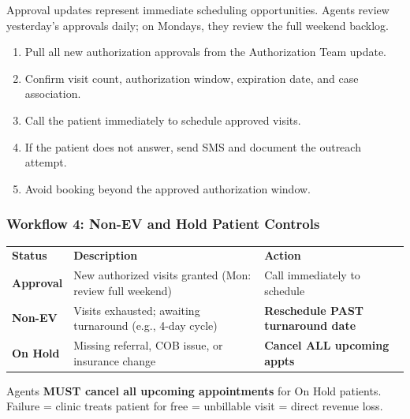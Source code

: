 \documentclass[11pt,a4paper]{article}
\begin{document}
Approval updates represent immediate scheduling opportunities. Agents review yesterday's approvals daily; on Mondays, they review the full weekend backlog.

\begin{tcolorbox}[successbox,title={Approval Scheduling SOP}]
\begin{enumerate}
  \item Pull all new authorization approvals from the Authorization Team update.
  \item Confirm visit count, authorization window, expiration date, and case association.
  \item Call the patient immediately to schedule approved visits.
  \item If the patient does not answer, send SMS and document the outreach attempt.
  \item Avoid booking beyond the approved authorization window.
\end{enumerate}
\end{tcolorbox}

\subsubsection{Workflow 4: Non-EV and Hold Patient Controls}

\begin{tcolorbox}[warnbox,title={Insurance Status Management Rules}]
\begin{tabularx}{\linewidth}{L{3.0cm} X L{3.2cm}}
  \color{white}\textbf{Status} & \color{white}\textbf{Description} & \color{white}\textbf{Action} \\
  \textbf{Approval}
    & New authorized visits granted (Mon: review full weekend)
    & Call immediately to schedule \\
  \textbf{Non-EV}
    & Visits exhausted; awaiting turnaround (e.g., 4-day cycle)
    & \textcolor{WarningAmber}{\bfseries Reschedule PAST turnaround date} \\
  \textbf{On Hold}
    & Missing referral, COB issue, or insurance change
    & \textcolor{DangerRed}{\bfseries Cancel ALL upcoming appts} \\
\end{tabularx}
\end{tcolorbox}

\begin{tcolorbox}[dangerbox,title={Critical Rule --- Hold Patients}]
Agents \textbf{MUST cancel all upcoming appointments} for On Hold patients. Failure = clinic treats patient for free = unbillable visit = direct revenue loss.
\end{tcolorbox}
\end{document}
